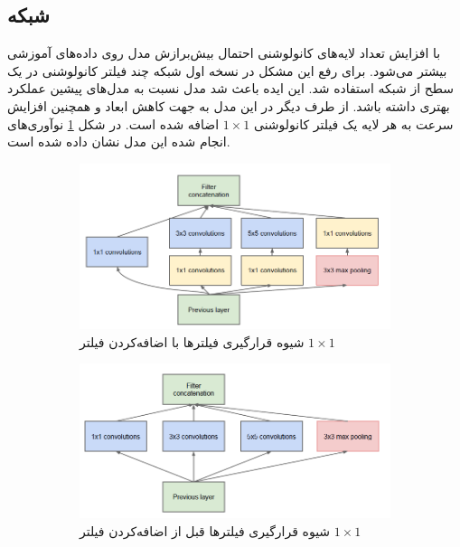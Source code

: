 \documentclass[12pt, a4paper]{article}
\begin{document}
\subsection*{شبکه }

با افزایش تعداد لایه‌های کانولوشنی احتمال بیش‌برازش مدل روی داده‌های آموزشی بیشتر می‌شود.
برای رفع این مشکل در نسخه اول شبکه  چند فیلتر کانولوشنی در یک سطح از شبکه
استفاده شد. این ایده باعث شد مدل نسبت به مدل‌های پیشین عملکرد بهتری داشته باشد. از طرف دیگر در این مدل
به جهت کاهش ابعاد و همچنین افزایش سرعت به هر لایه یک فیلتر کانولوشنی $1 \times 1$ اضافه شده است.
در شکل \ref{inceptionv1_convolution} نوآوری‌های انجام شده این مدل نشان داده شده است.

\begin{figure}[h]
    \begin{subfigure}{0.45\linewidth}
        \centering
        \includegraphics[width=0.8\linewidth]{images/inception/1by1.png}
        \caption{شیوه قرارگیری فیلترها با اضافه‌کردن فیلتر $1 \times 1$}
    \end{subfigure}
    \hfill
    \begin{subfigure}{0.45\linewidth}
        \centering
        \includegraphics[width=0.8\linewidth]{images/inception/before_1by1.png}
        \caption{شیوه قرارگیری فیلترها قبل از اضافه‌کردن فیلتر $1 \times 1$}
    \end{subfigure}
    \caption{}
    \label{inceptionv1_convolution}
\end{figure}
\end{document}
